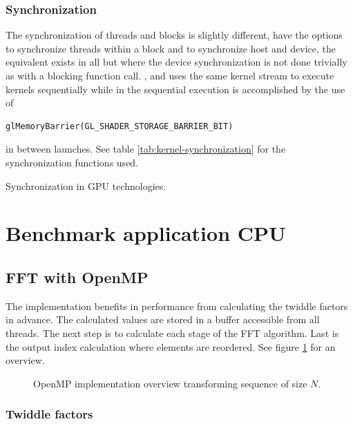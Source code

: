 \subsubsection{Synchronization}

The synchronization of threads and blocks is slightly different, {\CU} have the options to synchronize threads within a block and to synchronize host and device, the equivalent exists in all but {\DX} where the device synchronization is not done trivially as with a blocking function call. {\CU}, {\OCL} and {\DX} uses the same kernel stream to execute kernels sequentially while in {\GL} the sequential execution is accomplished by the use of
\begin{lstlisting}
glMemoryBarrier(GL_SHADER_STORAGE_BARRIER_BIT)
\end{lstlisting}
in between launches. See table \ref{tab:kernel-synchronization} for the synchronization functions used.

\begin{table}[H]
	\centering
	
	\caption{Synchronization in GPU technologies.}
	\label{tab:kernel-synchronization}
\end{table}

\section{Benchmark application CPU}

\subsection{FFT with OpenMP}

The {\OMP} implementation benefits in performance from calculating the twiddle factors in advance. The calculated values are stored in a buffer accessible from all threads. The next step is to calculate each stage of the \gls{FFT} algorithm. Last is the output index calculation where elements are reordered. See figure \ref{fig:omp:overview} for an overview.

\begin{figure}
	\centering
	
	\caption{OpenMP implementation overview transforming sequence of size $N$.}
	\label{fig:omp:overview}
\end{figure}

\subsubsection{Twiddle factors}

